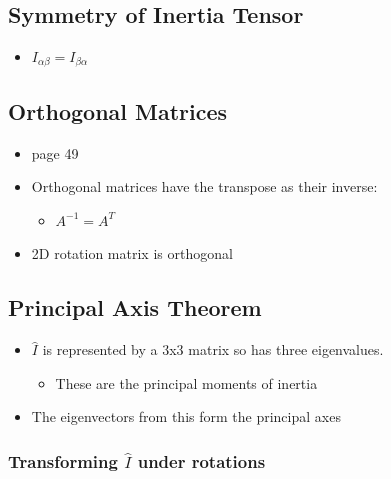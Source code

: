 \documentclass[a4paper,11pt,normalem]{article}
\begin{document}
\section{}\label{lecture-18}

\subsection{Symmetry of Inertia Tensor}\label{symmetry-of-inertia-tensor}

\begin{itemize}
\item
  \(I_{\alpha\beta} = I_{\beta\alpha}\)
\end{itemize}

\subsection{Orthogonal Matrices}\label{orthogal-matrices}
\begin{itemize}
\item
  page 49
\item
  Orthogonal matrices have the transpose as their inverse:
  \begin{itemize}
  \item
    \(A^{-1} = A^T\)
  \end{itemize}
\item
  2D rotation matrix is orthogonal
\end{itemize}

\subsection{Principal Axis Theorem}\label{principal-axis-theorem}

\begin{itemize}
\item
  \(\hat{I}\) is represented by a 3x3 matrix so has three eigenvalues.
  \begin{itemize}
  \item
    These are the principal moments of inertia
  \end{itemize}
\item
  The eigenvectors from this form the principal axes
\end{itemize}

\subsubsection{\texorpdfstring{Transforming \(\hat{I}\) under rotations}{Transforming \textbackslash{}hat\{I\} under rotations}}\label{transforming-hati-under-rotations}
\end{document}
